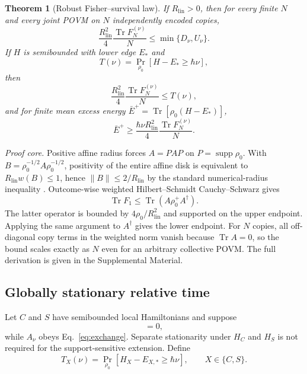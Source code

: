 \documentclass[aps,pra,preprint,nofootinbib]{revtex4-2}
\newtheorem{theorem}{Theorem}
\newcommand{\Tr}{\operatorname{Tr}}
\newcommand{\supp}{\operatorname{supp}}
\newcommand{\Rlin}{R_{\mathrm{lin}}}
\newcommand{\rhozero}{\rho_0}
\newcommand{\Fcl}{F}
\begin{document}
\begin{theorem}[Robust Fisher--survival law]
\label{thm:single-survival}
If $\Rlin>0$, then for every finite $N$ and every joint POVM on $N$ independently encoded copies,
\begin{equation}
\boxed{
\frac{\Rlin^2}{4}\frac{\Tr \Fcl_N^{(\nu)}}{N}
\le \min\{D_\nu,U_\nu\}.
}
\label{eq:robust-survival}
\end{equation}
If $H$ is semibounded with lower edge $E_*$ and
\begin{equation}
T(\nu)=\Pr_{\rhozero}[H-E_*\ge\hbar\nu],
\end{equation}
then
\begin{equation}
\frac{\Rlin^2}{4}\frac{\Tr \Fcl_N^{(\nu)}}{N}\le T(\nu),
\label{eq:tail-survival}
\end{equation}
and for finite mean excess energy $\bar E^+=\Tr[\rhozero(H-E_*)]$,
\begin{equation}
\bar E^+\ge
\frac{\hbar\nu\Rlin^2}{4}\frac{\Tr \Fcl_N^{(\nu)}}{N}.
\label{eq:energy-corollary}
\end{equation}
\end{theorem}

\emph{Proof core.} Positive affine radius forces $A=PAP$ on $P=\supp\rhozero$. With $B=\rhozero^{-1/2}A\rhozero^{-1/2}$, positivity of the entire affine disk is equivalent to $\Rlin w(B)\le1$, hence $\|B\|\le2/\Rlin$ by the standard numerical-radius inequality \cite{BhatiaJain2023}. Outcome-wise weighted Hilbert--Schmidt Cauchy--Schwarz gives
\begin{equation}
\Tr F_1\le\Tr(A\rhozero^+A^\dagger).
\end{equation}
The latter operator is bounded by $4\rhozero/\Rlin^2$ and supported on the upper endpoint. Applying the same argument to $A^\dagger$ gives the lower endpoint. For $N$ copies, all off-diagonal copy terms in the weighted norm vanish because $\Tr A=0$, so the bound scales exactly as $N$ even for an arbitrary collective POVM. The full derivation is given in the Supplemental Material.

\subsection{Globally stationary relative time}

Let $C$ and $S$ have semibounded local Hamiltonians and suppose
\begin{equation}
[\rhozero,H_C+H_S]=0,
\end{equation}
while $A_\nu$ obeys Eq.~\eqref{eq:exchange}. Separate stationarity under $H_C$ and $H_S$ is not required for the support-sensitive extension. Define
\begin{equation}
T_X(\nu)=\Pr_{\rhozero}[H_X-E_{X,*}\ge\hbar\nu],\qquad X\in\{C,S\}.
\end{equation}
\end{document}
